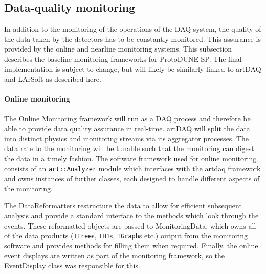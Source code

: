 \subsection{Data-quality monitoring}

In addition to the monitoring of the operations of the DAQ system, the
quality of the data taken by the detectors has to be constantly monitored.
This assurance is provided by the online and nearline monitoring systems.
This subsection describes the baseline monitoring frameworks for ProtoDUNE-SP.  
The final implementation is subject to change, but will likely be similarly
linked to artDAQ and LArSoft as described here.

\paragraph{Online monitoring}
The Online Monitoring framework will run as a DAQ process and therefore be
able to provide data quality assurance in real-time. artDAQ will split the  
data into distinct physics and monitoring streams via its aggregator processes.  
The data rate to the monitoring will be tunable such that the monitoring 
can digest the data in a timely fashion.
The software framework used for online monitoring 
consists of an
\texttt{art::Analyzer} module which interfaces with the artdaq framework and
owns instances of further classes, each designed to handle different aspects
of the monitoring.  


The DataReformatters restructure the data to allow for efficient subsequent
analysis and provide a standard interface to the methods which look through
the events.  These reformatted objects are passed to MonitoringData, which
owns all of the data products (\texttt{TTree}s, \texttt{TH1}s, \texttt{TGraph}s
etc.) output from the monitoring software and provides methods for filling
them when required.  Finally, the online event displays are
written as part of the monitoring framework, so the EventDisplay class was
responsible for this.  

